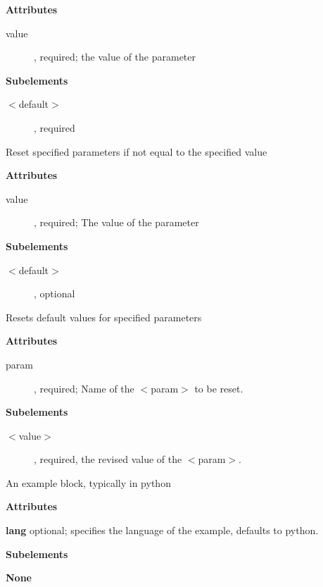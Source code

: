 \begin{description}
\begin{description}
\item \textbf{Attributes}
\begin{description}
\item [value], required; the value of the parameter
\end{description}
\item \textbf{Subelements}
\begin{description}
\item [$<$default$>$], required
\end{description}
\end{description}
\item [$<$notequals$>$ - optional]
Reset specified parameters if not equal to the specified value
\begin{description}
\item \textbf{Attributes}
\begin{description}
\item [value], required; The value of the parameter
\end{description}
\item \textbf{Subelements}
\begin{description}
\item [$<$default$>$], optional
\end{description}
\end{description}
\item [$<$default$>$ - optional]
Resets default values for specified parameters
\begin{description}
\item \textbf{Attributes}
\begin{description}
\item [param], required; Name of the $<$param$>$ to be reset.
\end{description}
\item \textbf{Subelements}
\begin{description}
\item [$<$value$>$], required, the revised value of the $<$param$>$.
\end{description}
\end{description}
\item [$<$example$>$ - optional]
An example block, typically in python
\begin{description}
\item \textbf{Attributes}
\begin{description}
\item \textbf{lang} optional; specifies the language of the example, defaults to python.
\end{description}
\item \textbf{Subelements}
\begin{description}
\item \textbf{None}
\end{description}
\end{description}
\end{description}

